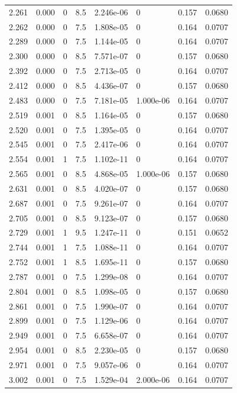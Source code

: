 \documentclass[preview]{standalone}
\begin{document}
{{{\begin{tabular}{L{1.2cm}C{1.2cm} C{0.3cm}C{0.5cm} C{1.4cm}C{1.4cm} C{1.4cm}C{1.4cm}}
  2.261  &  0.000  & 0     & 8.5 &  2.246e-06  & 0  & 0.157 &  0.0680   \\ 
  2.262  &  0.000  & 0     & 7.5 &  1.808e-05  & 0  & 0.164 &  0.0707   \\ 
  2.289  &  0.000  & 0     & 7.5 &  1.144e-05  & 0  & 0.164 &  0.0707   \\ 
  2.300  &  0.000  & 0     & 8.5 &  7.571e-07  & 0  & 0.157 &  0.0680   \\ 
  2.392  &  0.000  & 0     & 7.5 &  2.713e-05  & 0  & 0.164 &  0.0707   \\ 
  2.412  &  0.000  & 0     & 8.5 &  4.436e-07  & 0  & 0.157 &  0.0680   \\ 
  2.483  &  0.000  & 0     & 7.5 &  7.181e-05  & 1.000e-06  & 0.164 &  0.0707   \\ 
  2.519  &  0.001  & 0     & 8.5 &  1.164e-05  & 0  & 0.157 &  0.0680   \\ 
  2.520  &  0.001  & 0     & 7.5 &  1.395e-05  & 0  & 0.164 &  0.0707   \\ 
  2.545  &  0.001  & 0     & 7.5 &  2.417e-06  & 0  & 0.164 &  0.0707   \\ 
  2.554  &  0.001  & 1     & 7.5 &  1.102e-11  & 0  & 0.164 &  0.0707   \\ 
  2.565  &  0.001  & 0     & 8.5 &  4.868e-05  & 1.000e-06  & 0.157 &  0.0680   \\ 
  2.631  &  0.001  & 0     & 8.5 &  4.020e-07  & 0  & 0.157 &  0.0680   \\ 
  2.687  &  0.001  & 0     & 7.5 &  9.261e-07  & 0  & 0.164 &  0.0707   \\ 
  2.705  &  0.001  & 0     & 8.5 &  9.123e-07  & 0  & 0.157 &  0.0680   \\ 
  2.729  &  0.001  & 1     & 9.5 &  1.247e-11  & 0  & 0.151 &  0.0652   \\ 
  2.744  &  0.001  & 1     & 7.5 &  1.088e-11  & 0  & 0.164 &  0.0707   \\ 
  2.752  &  0.001  & 1     & 8.5 &  1.695e-11  & 0  & 0.157 &  0.0680   \\ 
  2.787  &  0.001  & 0     & 7.5 &  1.299e-08  & 0  & 0.164 &  0.0707   \\ 
  2.804  &  0.001  & 0     & 8.5 &  1.098e-05  & 0  & 0.157 &  0.0680   \\ 
  2.861  &  0.001  & 0     & 7.5 &  1.990e-07  & 0  & 0.164 &  0.0707   \\ 
  2.899  &  0.001  & 0     & 7.5 &  1.129e-06  & 0  & 0.164 &  0.0707   \\ 
  2.949  &  0.001  & 0     & 7.5 &  6.658e-07  & 0  & 0.164 &  0.0707   \\ 
  2.954  &  0.001  & 0     & 8.5 &  2.230e-05  & 0  & 0.157 &  0.0680   \\ 
  2.971  &  0.001  & 0     & 7.5 &  9.057e-06  & 0  & 0.164 &  0.0707   \\ 
  3.002  &  0.001  & 0     & 7.5 &  1.529e-04  & 2.000e-06  & 0.164 &  0.0707   \\ 
\hline 
\end{tabular} 

}}}
\end{document}
